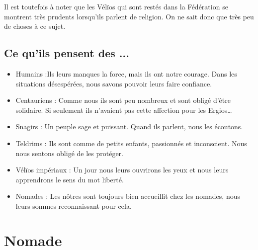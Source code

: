 \begin{multicols}{2}
Il est toutefois à noter que les Vélïos qui sont restés dans la Fédération se montrent très prudents lorsqu'ils parlent de religion. On ne sait donc que très peu de choses à ce sujet.

\section{Ce qu'ils pensent des ...}

\begin{itemize}
\item Humains :Ils leurs manques la force, mais ils ont notre courage. Dans les situations désespérées, nous savons pouvoir leurs faire confiance.
\item Centauriens : Comme nous ils sont peu nombreux et sont obligé d'être solidaire. Si seulement ils n'avaient pas cette affection pour les Ergios…
\item Snagirs : Un peuple sage et puissant. Quand ils parlent, nous les écoutons.
\item Teldrims : Ils sont comme de petits enfants, passionnés et inconscient. Nous nous sentons obligé de les protéger.
\item Vélïos impériaux : Un jour nous leurs ouvrirons les yeux et nous leurs apprendrons le sens du mot liberté.
\item Nomades : Les nôtres sont toujours bien accueillit chez les nomades, nous leurs sommes reconnaissant pour cela.
\end{itemize}

\end{multicols}


\chapter{Nomade}

